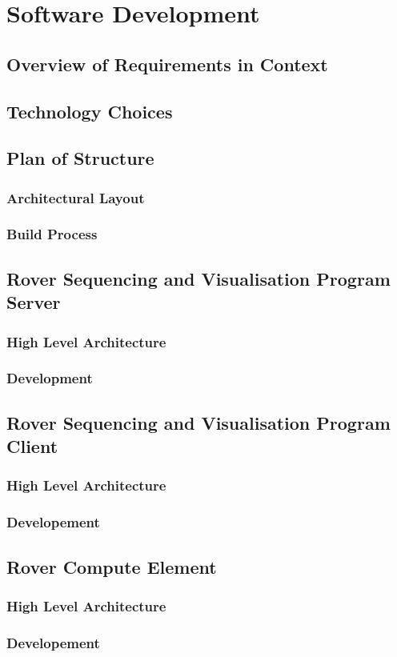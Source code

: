 \section{Software Development}
  \subsection{Overview of Requirements in Context}
  \subsection{Technology Choices}
  \subsection{Plan of Structure}
    \subsubsection{Architectural Layout}
    \subsubsection{Build Process}
  
  \subsection{Rover Sequencing and Visualisation Program Server}
    \subsubsection{High Level Architecture}
    \subsubsection{Development}
    
  \subsection{Rover Sequencing and Visualisation Program Client}
    \subsubsection{High Level Architecture}
    \subsubsection{Developement}
    
  \subsection{Rover Compute Element}
    \subsubsection{High Level Architecture}
    \subsubsection{Developement}
    